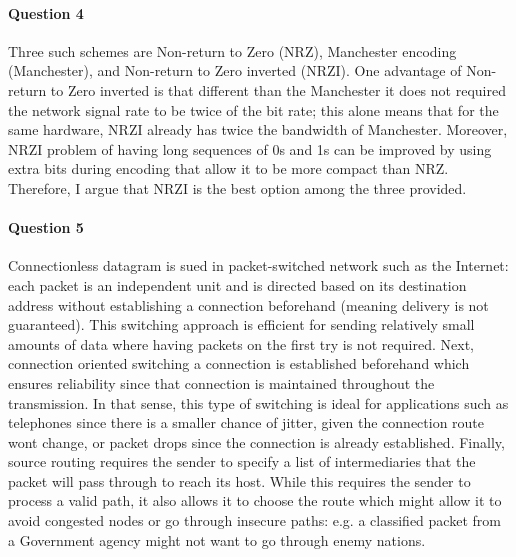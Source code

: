 \documentclass[12pt]{article}
\begin{document}
\paragraph*{Question 4}
Three such schemes are Non-return to Zero (NRZ), Manchester encoding (Manchester), and Non-return
to Zero inverted (NRZI). One advantage of Non-return to Zero inverted is that different than the Manchester
it does not required the network signal rate to be twice of the bit rate; this alone means that for
the same hardware, NRZI already has twice the bandwidth of Manchester. Moreover, NRZI problem of
having long sequences of 0s and 1s can be improved by using extra bits during encoding that allow it
to be more compact than NRZ. Therefore, I argue that NRZI is the best option among the three provided.

\pagebreak

\paragraph*{Question 5}
Connectionless datagram is sued in packet-switched network such as the Internet: each packet is
an independent unit and is directed based on its destination address without establishing a connection
beforehand (meaning delivery is not guaranteed). This switching approach is efficient for sending
relatively small amounts of data where having packets on the first try is not required. Next,
connection oriented switching a connection is established beforehand which ensures reliability
since that connection is maintained throughout the transmission. In that sense, this type of
switching is ideal for applications such as telephones since there is a smaller chance of jitter,
given the connection route wont change, or packet drops since the connection is already established.
Finally, source routing requires the sender to specify a list of intermediaries that the packet
will pass through to reach its host. While this requires the sender to process a valid path, it also
allows it to choose the route which might allow it to avoid congested nodes or go through insecure
paths: e.g. a classified packet from a Government agency might not want to go through enemy nations.
\end{document}
